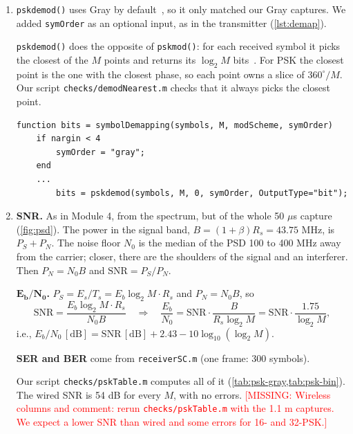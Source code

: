 \documentclass[11pt]{article}
\newcommand{\missing}[1]{\textcolor{red}{[MISSING: #1]}}
\begin{document}
\begin{enumerate}[resume]
    \item \texttt{pskdemod()} uses Gray by default~\cite{pskdemod}, so it only matched our Gray captures. We added \texttt{symOrder} as an optional input, as in the transmitter (\cref{lst:demap}).

    \texttt{pskdemod()} does the opposite of \texttt{pskmod()}: for each received symbol it picks the closest of the $M$ points and returns its $\log_2 M$ bits~\cite{pskdemod}. For PSK the closest point is the one with the closest phase, so each point owns a slice of $360^\circ/M$. Our script \texttt{checks/demodNearest.m} checks that it always picks the closest point.

\begin{lstlisting}[caption={Our changes to \texttt{symbolDemapping.m}.}, label={lst:demap}]
function bits = symbolDemapping(symbols, M, modScheme, symOrder)
    if nargin < 4
        symOrder = "gray";
    end
    ...
        bits = pskdemod(symbols, M, 0, symOrder, OutputType="bit");
\end{lstlisting}

    \item \textbf{SNR.} As in Module 4, from the spectrum, but of the whole 50 $\mu$s capture (\cref{fig:psd}). The power in the signal band, $B = (1+\beta)R_s = 43.75$ MHz, is $P_S + P_N$. The noise floor $N_0$ is the median of the PSD 100 to 400 MHz away from the carrier; closer, there are the shoulders of the signal and an interferer. Then $P_N = N_0 B$ and $\text{SNR} = P_S/P_N$.

    \textbf{$\bm{E_b/N_0}$.} $P_S = E_s/T_s = E_b \log_2 M \cdot R_s$ and $P_N = N_0 B$, so
    \begin{equation}
        \text{SNR} = \frac{E_b \log_2 M \cdot R_s}{N_0 B} \quad \Longrightarrow \quad \frac{E_b}{N_0} = \text{SNR} \cdot \frac{B}{R_s \log_2 M} = \text{SNR} \cdot \frac{1.75}{\log_2 M},
    \end{equation}
    i.e., $E_b/N_0\,[\text{dB}] = \text{SNR}\,[\text{dB}] + 2.43 - 10\log_{10}(\log_2 M)$.

    \textbf{SER and BER} come from \texttt{receiverSC.m} (one frame: 300 symbols).

    Our script \texttt{checks/pskTable.m} computes all of it (\cref{tab:psk-gray,tab:psk-bin}). The wired SNR is 54 dB for every $M$, with no errors. \missing{Wireless columns and comment: rerun \texttt{checks/pskTable.m} with the 1.1 m captures. We expect a lower SNR than wired and some errors for 16- and 32-PSK.}


\end{enumerate}
\end{document}
